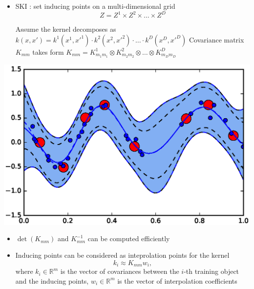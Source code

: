 \documentclass[a0,portrait]{a0poster}
\newcommand{\R}{\mathbb{R}}
\begin{document}
\begin{multicols}{2}
\begin{itemize}
  \item SKI \citep{wilson2015}: set inducing points on a multi-dimensional grid
    \[
      Z = Z^1 \times Z^2 \times \ldots \times Z^D
    \]
  
    Assume the kernel decomposes as
    $
      k(x, x') = k^1(x^1, x'^1) \cdot k^2(x^2, x'^2) \cdot \ldots \cdot k^D(x^D, x'^D)
    $
    Covariance matrix $K_{mm}$ takes form
    $
      K_{mm} = K_{m_1 m_1}^1 \otimes K_{m_2 m_2}^2 \otimes \ldots \otimes K_{m_D m_D}^D
    $ 

\end{itemize}
\begin{minipage}[b]{0.45\linewidth}

  \begin{center}
    \includegraphics[width=1.\linewidth]{pics/gps/1d_gp_ind_inputs.eps}
  \end{center}

  \vspace{-1cm}
\end{minipage}
\begin{minipage}[b]{0.5\linewidth}
  \begin{center}
    \centering
    \scalebox{1.25}{
      
    }
  \end{center}
\end{minipage}
    
    \begin{itemize}
      \item $\det(K_{mm})$ and $K_{mm}^{-1}$ can be computed efficiently
      \item Inducing points can be considered as inteprolation points for the
        kernel
        \[
          k_i \approx K_{mm} w_i,
        \]
      where $k_i \in \R^m$ is the vector of covariances between the $i$-th training
      object and the inducing points, $w_i\in \R^{m}$ is the vector of interpolation coefficients


\end{itemize}
\end{multicols}
\end{document}
